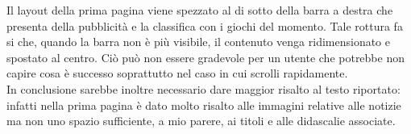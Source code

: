 \documentclass[../ProgettoTecWeb2.tex]{subfiles}
\begin{document}
		Il layout della prima pagina viene spezzato al di sotto della barra a destra che presenta della pubblicità e la classifica con i giochi del momento. Tale rottura fa si che, quando la barra non è più visibile, il contenuto venga ridimensionato e spostato al centro. Ciò può non essere gradevole per un utente che potrebbe non capire cosa è successo soprattutto nel caso in cui scrolli rapidamente. \\

		In conclusione sarebbe inoltre necessario dare maggior risalto al testo riportato: infatti nella prima pagina è dato molto risalto alle immagini relative alle notizie ma non uno spazio sufficiente, a mio parere, ai titoli e alle didascalie associate.
\end{document}
